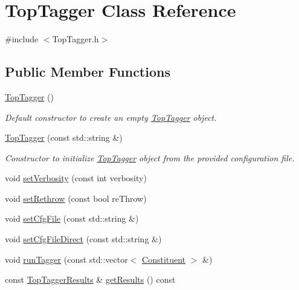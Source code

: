 \hypertarget{classTopTagger}{\section{Top\-Tagger Class Reference}
\label{classTopTagger}
}


{\ttfamily \#include $<$Top\-Tagger.\-h$>$}

\subsection*{Public Member Functions}
\begin{DoxyCompactItemize}
\item 
\hypertarget{classTopTagger_a26e4654b1eef1f7e7dcffeb02b9fc41b}{\hyperlink{classTopTagger_a26e4654b1eef1f7e7dcffeb02b9fc41b}{Top\-Tagger} ()}\label{classTopTagger_a26e4654b1eef1f7e7dcffeb02b9fc41b}

\begin{DoxyCompactList}\small\item\em Default constructor to create an empty \hyperlink{classTopTagger}{Top\-Tagger} object. \end{DoxyCompactList}\item 
\hypertarget{classTopTagger_a21d623a93398346401fb78bb09fe98b6}{\hyperlink{classTopTagger_a21d623a93398346401fb78bb09fe98b6}{Top\-Tagger} (const std\-::string \&)}\label{classTopTagger_a21d623a93398346401fb78bb09fe98b6}

\begin{DoxyCompactList}\small\item\em Constructor to initialize \hyperlink{classTopTagger}{Top\-Tagger} object from the provided configuration file. \end{DoxyCompactList}\item 
void \hyperlink{classTopTagger_ad7e22571559cb7afe0f0cf0e14d1ef41}{set\-Verbosity} (const int verbosity)
\item 
void \hyperlink{classTopTagger_ae117c09fc42674a09247fd1ad8dcb3ce}{set\-Rethrow} (const bool re\-Throw)
\item 
void \hyperlink{classTopTagger_ac18bfe0673dbd05973f45c668ed2b190}{set\-Cfg\-File} (const std\-::string \&)
\item 
void \hyperlink{classTopTagger_ae7a38be12023643495adea6f9a696ff3}{set\-Cfg\-File\-Direct} (const std\-::string \&)
\item 
void \hyperlink{classTopTagger_accf43da3b1469e524bfe6f568116219a}{run\-Tagger} (const std\-::vector$<$ \hyperlink{classConstituent}{Constituent} $>$ \&)
\item 
const \hyperlink{classTopTaggerResults}{Top\-Tagger\-Results} \& \hyperlink{classTopTagger_ac6f06aeb683b0b761ad09ac018e11d08}{get\-Results} () const 
\end{DoxyCompactItemize}


